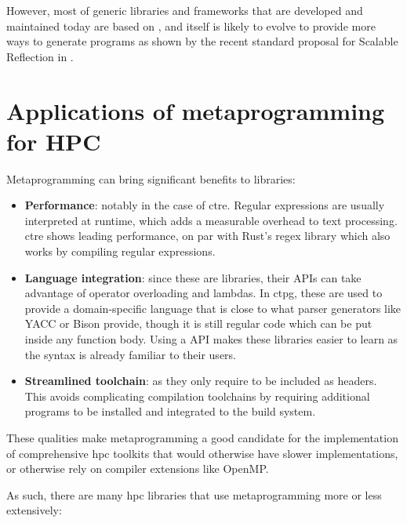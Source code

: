 \documentclass[../main]{subfiles}
\begin{document}
However, most of generic libraries and frameworks that are developed
and maintained today are based on \cpp, and \cpp itself is likely to
evolve to provide more ways to generate programs as shown by the recent
standard proposal for Scalable Reflection in \cpp \cite{scalable-reflection}.

\section{
  Applications of metaprogramming for HPC
}

Metaprogramming can bring significant benefits to libraries:

\begin{itemize}

  \item

\textbf{Performance}: notably in the case of \gls{ctre}.
Regular expressions are usually interpreted at runtime,
which adds a measurable overhead to text processing.
\gls{ctre} shows leading performance, on par with Rust's regex library
which also works by compiling regular expressions.

  \item

\textbf{Language integration}: since these are \cpp libraries,
their APIs can take advantage of \cpp operator overloading and lambdas.
In \gls{ctpg}, these are used to provide a domain-specific language that is close to
what parser generators like YACC or Bison provide,
though it is still regular \cpp code which can be put inside any function body.
Using a \cpp API makes these libraries easier to learn
as the syntax is already familiar to their users.

  \item

\textbf{Streamlined toolchain}: as they only require to be included as headers.
This avoids complicating compilation toolchains by requiring additional programs
to be installed and integrated to the build system.

\end{itemize}

These qualities make metaprogramming a good candidate for the implementation
of comprehensive \gls{hpc} toolkits that would otherwise have
slower implementations, or otherwise rely on compiler extensions like OpenMP.

As such, there are many \cpp \gls{hpc} libraries that use metaprogramming
more or less extensively:
\end{document}
